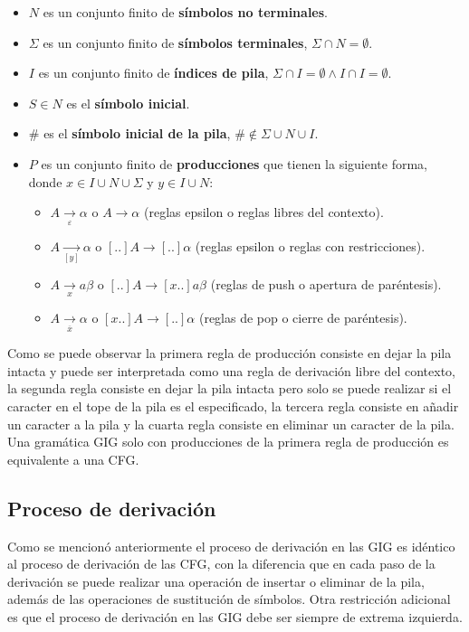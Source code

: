 \begin{itemize}
    \item $N$ es un conjunto finito de \textbf{símbolos no terminales}.
    \item \( \Sigma \) es un conjunto finito de \textbf{símbolos terminales}, $\Sigma \cap N=\emptyset$.
    \item $I$ es un conjunto finito de \textbf{índices de pila}, $\Sigma \cap I=\emptyset \wedge I \cap I=\emptyset$.
    \item $S\in N$ es el \textbf{símbolo inicial}.
    \item $\#$ es el \textbf{símbolo inicial de la pila}, $\# \notin \Sigma \cup N \cup I$.
    \item $P$ es un conjunto finito de \textbf{producciones} que tienen la siguiente forma, donde $x\in I\cup N\cup \Sigma$ y $y\in I\cup N$:
          \begin{itemize}
              \item $A \underset{\varepsilon}{\to} \alpha$ o $A \to \alpha$ (reglas epsilon o reglas libres del contexto).
              \item $A \underset{[y]}{\to}  \alpha$ o $[..]A \to [..]\alpha$ (reglas epsilon o reglas con restricciones).
              \item $A \underset{x}{\to} a \beta$ o $[..]A \to  [x..]a\beta$ (reglas de push o apertura de paréntesis).
              \item $A \underset{\overline{x}}{\to} \alpha$ o $[x..]A \to [..]\alpha$ (reglas de pop o cierre de paréntesis).
          \end{itemize}
\end{itemize}

Como se puede observar la primera regla de producción consiste en dejar la pila intacta y puede ser interpretada como una regla de derivación
libre del contexto, la segunda regla consiste en dejar la pila intacta pero solo se puede realizar si el caracter en el tope de la pila es el
especificado, la tercera regla consiste en añadir un caracter a la pila y la cuarta regla consiste en eliminar un caracter de la pila.
Una gramática GIG solo con producciones de la primera regla de producción es equivalente a una CFG.

\subsection{Proceso de derivación}

Como se mencionó anteriormente el proceso de derivación en las GIG es idéntico al proceso de derivación de las CFG, con la diferencia que
en cada paso de la derivación se puede realizar una operación de insertar o eliminar de la pila, además de las operaciones de sustitución de símbolos.
Otra restricción adicional es que el proceso de derivación en las GIG debe ser siempre de extrema izquierda.

